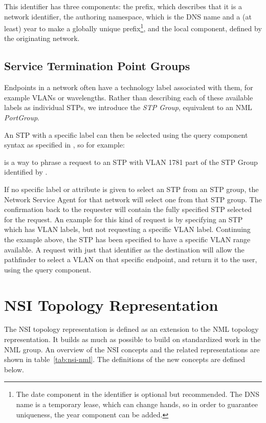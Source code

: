 \documentclass[12pt]{article}  %
\begin{document}
This identifier has three components: the prefix,  
which describes that it is a network identifier, the authoring namespace,  
which is the DNS name and a (at least) year to make a globally unique prefix\footnote{  
The date component in the identifier is optional but recommended. The DNS name 
is a temporary lease, which can change hands, so in order to guarantee uniqueness, 
the year component can be added.}, and the local component,  defined by the originating 
network.


\subsection{Service Termination Point Groups}

Endpoints in a network often have a technology label associated 
with them, for example VLANs or wavelengths. Rather than describing each of these 
available labels as individual STPs, we introduce the \emph{STP Group}, equivalent to 
an NML \emph{PortGroup}.

An STP with a specific label can then be selected using the query 
component syntax as specified in \cite{RFC3986}, so for example:

 is a way to phrase 
a request to an STP with VLAN 1781 part of the STP Group identified by 
.


If no specific label or attribute is given to select an STP from 
an STP group, the Network Service Agent for that network will select one from that STP group. The 
confirmation back to the requester will contain the fully specified STP selected 
for the request. An example for this kind of request is by specifying an STP which 
has VLAN labels, but not requesting a specific VLAN label. Continuing the example 
above, the STP  has been specified to have a 
specific VLAN range available. A request with just that identifier as the destination 
will allow the pathfinder to select a VLAN on that specific endpoint, and return 
it to the user, using the query component.


\section{NSI Topology Representation} %
\label{sub:nsi_topology_representation}

 The NSI topology representation is defined as an extension to the NML topology 
representation. It builds as much as possible to build on standardized work in the NML group.
An overview of the NSI concepts and the related representations are shown in table~\ref{tab:nsi-nml}.
The definitions of the new concepts are defined below.
\end{document}
